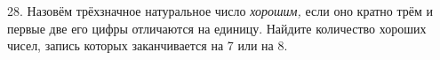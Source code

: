 28. Назовём трёхзначное натуральное число {\it хорошим,} если оно кратно трём и первые две его цифры отличаются на единицу. Найдите количество хороших чисел, запись которых заканчивается на 7 или на 8.\\
